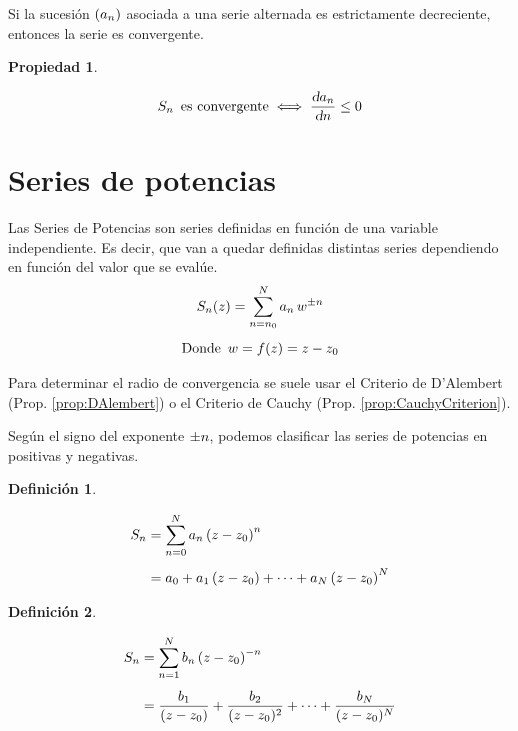 \documentclass[a5paper,12pt,twoside]{book}
\newtheorem{defn}{{Definición}}[chapter]
\newtheorem{prop}{{Propiedad}}[chapter]
\begin{document}
Si la sucesión $(a_n)$ asociada a una serie alternada es estrictamente decreciente, entonces la serie es convergente.

\begin{mdframed}[style=PropertyFrame]
    \begin{prop}
    \end{prop}
    \begin{equation*}
        S_n \enspace \textrm{es convergente} \iff \frac{\textsl{d} a_n}{\textsl{d} n} \leq 0
    \end{equation*}
\end{mdframed}


\section{Series de potencias}

Las Series de Potencias son series definidas en función de una variable independiente.
Es decir, que van a quedar definidas distintas series dependiendo en función del valor que se evalúe.
\begin{gather*}
    S_n(z) = \sum_{n=n_0}^N a_n \, w^{\pm n}
    \\[1ex]
    \textrm{Donde} \enspace w = f(z) = z-z_0
\end{gather*}

Para determinar el radio de convergencia se suele usar el Criterio de D'Alembert (Prop. \ref{prop:DAlembert}) o el Criterio de Cauchy (Prop. \ref{prop:CauchyCriterion}).

Según el signo del exponente $\pm n$, podemos clasificar las series de potencias en positivas y negativas.

\begin{mdframed}[style=DefinitionFrame]
    \begin{defn}
        \label{defn:posPowerSeries}
    \end{defn}
    \begin{align*}
        S_n &= \sum_{n=0}^N a_n \left( z-z_0 \right)^n
        \\[1ex]
        &= a_0 + a_1 \left( z-z_0 \right) + \dots + a_N \left( z-z_0 \right)^N
    \end{align*}
\end{mdframed}

\begin{mdframed}[style=DefinitionFrame]
    \begin{defn}
    \end{defn}
    \begin{align*}
        S_n &= \sum_{n=1}^N b_n \left( z-z_0 \right)^{-n}
        \\[1ex]
        &= \frac{b_1}{(z-z_0)} + \frac{b_2}{(z-z_0)^2} + \dots + \frac{b_N}{(z-z_0)^N}
    \end{align*}
\end{mdframed}
\end{document}
